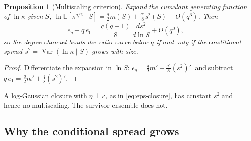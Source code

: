 \documentclass[11pt]{article}
\newcommand{\E}{\mathbb E}
\newcommand{\Var}{\operatorname{Var}}
\newtheorem{proposition}{Proposition}
\theoremstyle{remark}
\begin{document}
\begin{proposition}[Multiscaling criterion]\label{prop:multiscaling}
Expand the cumulant generating function of $\ln\kappa$ given $S$,
$\ln\E[\kappa^{q/2}\mid S]=\tfrac q2 m(S)+\tfrac{q^2}{8}s^2(S)+O(q^3)$.  Then
\begin{equation}
  e_q-q\,e_1=\frac{q(q-1)}{8}\,\frac{ds^2}{d\ln S}+O(q^3),
  \label{eq:criterion}
\end{equation}
so the degree channel bends the ratio curve below $q$ if and only if the conditional spread
$s^2=\Var(\ln\kappa\mid S)$ grows with size.
\end{proposition}

\begin{proof}
Differentiate the expansion in $\ln S$: $e_q=\tfrac q2m'+\tfrac{q^2}{8}(s^2)'$, and subtract
$q\,e_1=\tfrac q2m'+\tfrac q8(s^2)'$.
\end{proof}

A log-Gaussian closure with $\eta\perp\kappa$, as in \eqref{eq:eps-closure}, has constant
$s^2$ and hence no multiscaling.  The survivor ensemble does not.

\subsection{Why the conditional spread grows}
\end{document}
